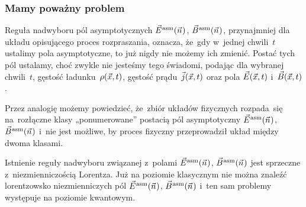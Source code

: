 \documentclass[10pt,t]{beamer}
\begin{document}
\begin{frame}
  \frametitle{Mamy poważny problem}




  Reguła nadwyboru pól asymptotycznych $\vec{E}^{ \hspace{0.05em} \text{asm} }( \vec{n} \hspace{0.05em} )$, $\vec{B}^{ \hspace{0.05em} \text{asm} }( \vec{n} \hspace{0.05em} )$, przynajmniej
  dla układu opisującego proces rozpraszania, oznacza, że~gdy w~jednej
  chwili~$t$ ustalimy pola asymptotyczne, to już \alert{nigdy} nie możemy
  ich zmienić. Postać tych pól ustalamy, choć zwykle nie jesteśmy tego
  świadomi, podając dla wybranej chwili~$t$, gęstość
  ładunku~$\rho( \vec{x}, t )$, gęstość prądu~$\vec{j}( \vec{x}, t )$ oraz pola
  $\vec{E}( \vec{x}, t )$ i~$\vec{B}( \vec{x}, t )$.

  Przez analogię możemy powiedzieć, że~zbiór układów fizycznych rozpada~się
  na~rozłączne klasy „ponumerowane” postacią pól asymptotyczny
  $\vec{E}^{ \hspace{0.05em} \text{asm} }( \vec{n} \hspace{0.05em} )$, $\vec{B}^{ \hspace{0.05em} \text{asm} }( \vec{n} \hspace{0.05em} )$ i~\alert{nie} jest możliwe, by proces
  fizyczny przeprowadził układ między dwoma klasami.

  Istnienie reguły nadwyboru związanej z~polami $\vec{E}^{ \hspace{0.05em} \text{asm} }( \vec{n} \hspace{0.05em} )$, $\vec{B}^{ \hspace{0.05em} \text{asm} }( \vec{n} \hspace{0.05em} )$ jest
  \alert{sprzeczne} z~niezmienniczością Lorentza. Już na poziomie klasycznym
  nie można znaleźć lorentzowsko niezmienniczych pól $\vec{E}^{ \hspace{0.05em} \text{asm} }( \vec{n} \hspace{0.05em} )$, $\vec{B}^{ \hspace{0.05em} \text{asm} }( \vec{n} \hspace{0.05em} )$
  i~ten sam problemy występuje na poziomie kwantowym.

\end{frame}
\end{document}
